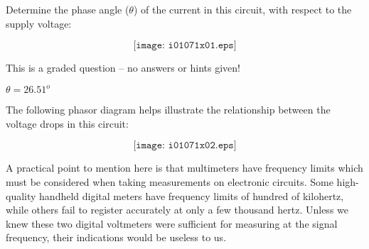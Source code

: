 

Determine the phase angle ($\theta$) of the current in this circuit, with respect to the supply voltage:

$$\texttt{[image: i01071x01.eps]}$$

\vfil 

\eject






This is a graded question -- no answers or hints given!







$\theta = 26.51^o$

\vskip 10pt

The following phasor diagram helps illustrate the relationship between the voltage drops in this circuit:

$$\texttt{[image: i01071x02.eps]}$$

A practical point to mention here is that multimeters have frequency limits which must be considered when taking measurements on electronic circuits.  Some high-quality handheld digital meters have frequency limits of hundred of kilohertz, while others fail to register accurately at only a few thousand hertz.  Unless we knew these two digital voltmeters were sufficient for measuring at the signal frequency, their indications would be useless to us.




